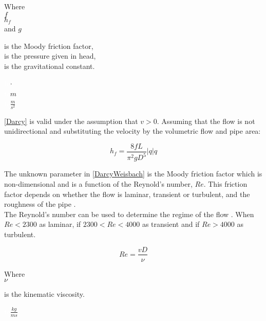  \begin{minipage}[t]{0.20\textwidth}
Where\\
\hspace*{8mm} $f$ \\
\hspace*{8mm} $h_f$ \\
and\hspace*{0.7mm} $g$ 
\end{minipage}
\begin{minipage}[t]{0.68\textwidth}
\vspace*{2mm}
is the Moody friction factor,\\ 
is the pressure given in head,\\   
is the gravitational constant.
\end{minipage}
\begin{minipage}[t]{0.10\textwidth}
\vspace*{2mm}
\textcolor{White}{te}$\unit{\cdot}$\\
\textcolor{White}{te}$\unit{m}$\\
\textcolor{White}{te}$\unit{\frac{m}{s^2}}$
\end{minipage}

\eqref{Darcy} is valid under the assumption that $v>0$. %
 Assuming that the flow is not unidirectional and substituting the velocity by the volumetric flow and pipe area:

\begin{equation}
  h_f = \frac{8fL}{\pi^{2}gD^5} |q| q
  \label{DarcyWeisbach}
\end{equation} 
 
 The unknown parameter in \eqref{DarcyWeisbach} is the Moody friction factor 
 which is non-dimensional and is a function of the Reynold's number, $Re$. This friction factor depends on whether the flow is laminar, transient or turbulent, and the roughness of the pipe \cite{Intro_Fluid}. \\
 
 
The Reynold's number can be used to determine the regime of the flow \cite{Intro_Fluid}. When $Re<2300$ as laminar, if $2300<Re<4000$ as transient and if
$Re>4000$ as turbulent. 

\begin{equation}
   Re = \frac{vD}{\nu}
   \label{Reynolds}
 \end{equation}
 
  \begin{minipage}[t]{0.20\textwidth}
Where\\
\hspace*{8mm} $\nu$ 
\end{minipage}
\begin{minipage}[t]{0.68\textwidth}
\vspace*{2mm}
is the kinematic viscosity.

\end{minipage}
\begin{minipage}[t]{0.10\textwidth}
\vspace*{2mm}
\textcolor{White}{te}$\unit{\frac{kg}{ms}}$
\end{minipage}

